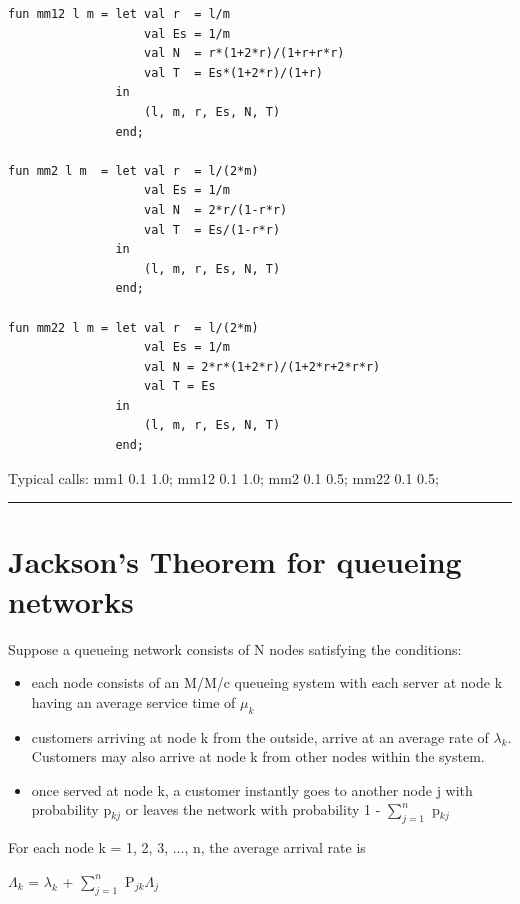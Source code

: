 \documentclass[12pt,fleqn]{report}
\begin{document}
\begin{enumerate}
\begin{verbatim}
fun mm12 l m = let val r  = l/m
                   val Es = 1/m
                   val N  = r*(1+2*r)/(1+r+r*r)
                   val T  = Es*(1+2*r)/(1+r)
               in
                   (l, m, r, Es, N, T)
               end;

fun mm2 l m  = let val r  = l/(2*m)
                   val Es = 1/m
                   val N  = 2*r/(1-r*r)
                   val T  = Es/(1-r*r)
               in
                   (l, m, r, Es, N, T)
               end;

fun mm22 l m = let val r  = l/(2*m)
                   val Es = 1/m
                   val N = 2*r*(1+2*r)/(1+2*r+2*r*r)
                   val T = Es
               in
                   (l, m, r, Es, N, T)
               end;
\end{verbatim}
\normalsize

Typical calls: mm1 0.1 1.0; mm12 0.1 1.0; mm2 0.1 0.5; mm22 0.1 0.5;
\end{enumerate}

\noindent
\hfill{\rule{160mm}{0.5mm}}




\newpage
\section{Jackson's Theorem for queueing networks}

Suppose a queueing network consists of N nodes satisfying the
conditions:

\begin{itemize}

\item each node consists of an M/M/c queueing system
with each server at node k having an average service time of
$\mu_k$

\item customers arriving at node k from the outside,
arrive at an average rate of $\lambda_k$.
Customers may also arrive at node k from other nodes within
the system.

\item once served at node k, a customer instantly goes to another node
j with probability p$_{kj}$ or leaves the network with probability
1 - $\sum_{j=1}^{n}$ p$_{kj}$

\end{itemize}

For each node k = 1, 2, 3, ..., n, the average arrival rate is

\begin{center}
$\Lambda_k$ = $\lambda_k$ + $\sum_{j=1}^{n}$ P$_{jk}$$\Lambda_j$
\end{center}
\end{document}
